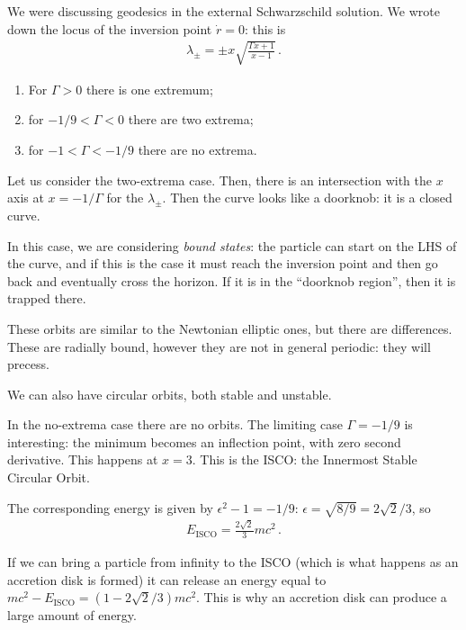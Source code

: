 \documentclass[main.tex]{subfiles}
\begin{document}


We were discussing geodesics in the external Schwarzschild solution. 
We wrote down the locus of the inversion point \(\dot{r} = 0\): this is 
%
\begin{align}
\lambda_{\pm} = \pm x \sqrt{\frac{\Gamma x + 1}{x-1}}
\,.
\end{align}

\begin{enumerate}
    \item For \(\Gamma > 0\) there is one extremum;
    \item for \(- 1/9 < \Gamma < 0\) there are two extrema;
    \item for \(-1 < \Gamma < - 1/9\) there are no extrema. 
\end{enumerate}

Let us consider the two-extrema case. Then, there is an intersection with the \(x\) axis at \(x = - 1/ \Gamma \) for the \(\lambda_{\pm }\). 
Then the curve looks like a doorknob: it is a closed curve. 

In this case, we are considering \emph{bound states}: the particle can start on the LHS of the curve, and if this is the case it must reach the inversion point and then go back and eventually cross the horizon.
If it is in the ``doorknob region'', then it is trapped there. 

These orbits are similar to the Newtonian elliptic ones, but there are differences. These are radially bound, however they are not in general periodic: they will precess.

We can also have circular orbits, both stable and unstable. 

In the no-extrema case there are no orbits. The limiting case \(\Gamma = - 1/9\) is interesting: the minimum becomes an inflection point, with zero second derivative.  
This happens at \(x = 3\). 
This is the ISCO: the Innermost Stable Circular Orbit.

The corresponding energy is given by \(\epsilon^2 - 1 = - 1/9\): \(\epsilon = \sqrt{8/9} =  2 \sqrt{2}  /3\), so 
%
\begin{align}
E _{\text{ISCO}} = \frac{2 \sqrt{2}}{3} mc^2
\,.
\end{align}

If we can bring a particle from infinity to the ISCO (which is what happens as an accretion disk is formed) it can release an energy equal to \(mc^2 - E _{\text{ISCO}} = (1 - 2 \sqrt{2} / 3) m c^2\). This is why an accretion disk can produce a large amount of energy. 
\end{document}
